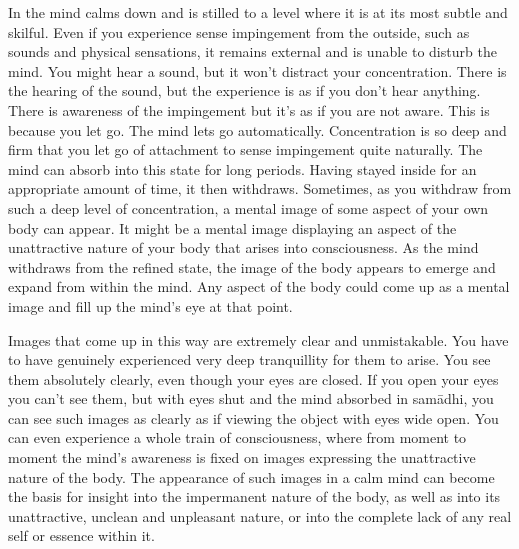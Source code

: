 In  the mind calms down and is stilled to a level where it is at its most subtle and skilful. Even if you experience sense impingement from the outside, such as sounds and physical sensations, it remains external and is unable to disturb the mind. You might hear a sound, but it won't distract your concentration. There is the hearing of the sound, but the experience is as if you don't hear anything. There is awareness of the impingement but it's as if you are not aware. This is because you let go. The mind lets go automatically. Concentration is so deep and firm that you let go of attachment to sense impingement quite naturally. The mind can absorb into this state for long periods. Having stayed inside for an appropriate amount of time, it then withdraws. Sometimes, as you withdraw from such a deep level of concentration, a mental image of some aspect of your own body can appear. It might be a mental image displaying an aspect of the unattractive nature of your body that arises into consciousness. As the mind withdraws from the refined state, the image of the body appears to emerge and expand from within the mind. Any aspect of the body could come up as a mental image and fill up the mind's eye at that point.

Images that come up in this way are extremely clear and unmistakable. You have to have genuinely experienced very deep tranquillity for them to arise. You see them absolutely clearly, even though your eyes are closed. If you open your eyes you can't see them, but with eyes shut and the mind absorbed in sam\=adhi, you can see such images as clearly as if viewing the object with eyes wide open. You can even experience a whole train of consciousness, where from moment to moment the mind's awareness is fixed on images expressing the unattractive nature of the body. The appearance of such images in a calm mind can become the basis for insight into the impermanent nature of the body, as well as into its unattractive, unclean and unpleasant nature, or into the complete lack of any real self or essence within it.

